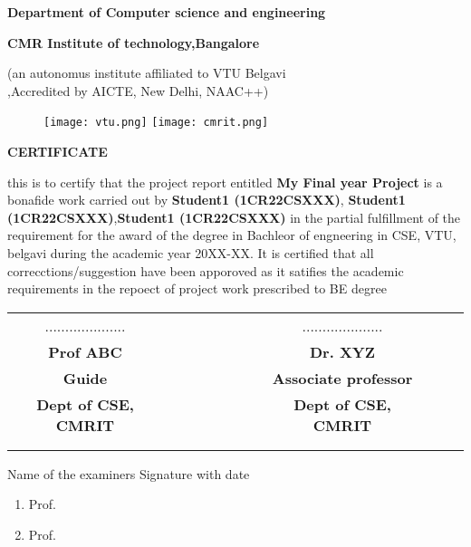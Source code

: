\documentclass{article}
\begin{document}
\thispagestyle{empty}
\vspace*{-0.75in}
\begin{center}

\begin{LARGE}
   \textbf{Department of Computer science and engineering}\\
\end{LARGE}
\begin{LARGE}
   \textbf{CMR Institute of technology,Bangalore}\\
\end{LARGE}  
\begin{small}
    (an autonomus institute affiliated to VTU Belgavi\\,Accredited by AICTE, New Delhi, NAAC++)\\
\end{small}

\vspace{0.2cm}
\begin{figure}[h]
    \centering
    \texttt{[image: vtu.png]}
    \hspace{0.1\textwidth}
    \texttt{[image: cmrit.png]}
\end{figure}
\large\textbf{CERTIFICATE}
\end{center}

\begin{normalsize}
this is to certify that the project report entitled \textbf{My Final year Project} is a bonafide work carried out by \textbf{Student1 (1CR22CSXXX)}, \textbf{Student1 (1CR22CSXXX)},\textbf{Student1 (1CR22CSXXX)} in the partial fulfillment of the requirement for the award of the degree in Bachleor of engneering in CSE, VTU, belgavi during the academic year 20XX-XX.
It is certified that all correcctions/suggestion have been apporoved as it satifies the academic requirements in the repoect of project work prescribed to BE degree
\end{normalsize}
\vspace{2cm}
\begin{table}[h!]

\centering
\begin{tabular}{cccccccccccc}
....................&&&&&&&&....................\\
\textbf{{\footnotesize Prof ABC}} &&&&&&&& \textbf{{\footnotesize Dr. XYZ}}\\
\textbf{{\footnotesize Guide}} &&&&&&&&\textbf{{\footnotesize Associate professor}}\\
\textbf{{\footnotesize Dept of CSE, CMRIT}} &&&&&&&&\textbf{{\footnotesize Dept of CSE, CMRIT}}\\
\\
\\
\end{tabular}

\end{table}


Name of the examiners \hfill Signature with date
\begin{small}
\begin{enumerate}
    \item Prof.
    \item Prof.
\end{enumerate}
\end{small}
\end{document}
